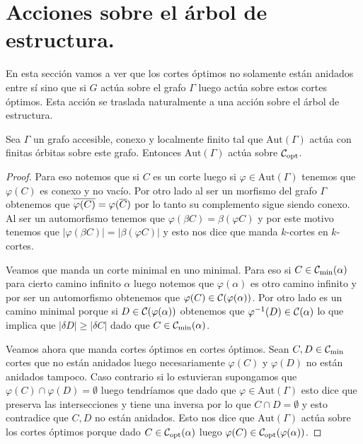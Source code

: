 \documentclass[tesis.tex]{subfiles}
\newcommand{\aut}{\text{Aut}}
\begin{document}
\section{Acciones sobre el árbol de estructura.}

En esta sección vamos a ver que los cortes óptimos no solamente están anidados entre sí sino que si $G$ actúa sobre el grafo $\Gamma$ luego actúa sobre estos cortes óptimos.
Esta acción se traslada naturalmente a una acción sobre el árbol de estructura.



\begin{prop}
	Sea $\Gamma$ un grafo accesible, conexo y localmente finito tal que $\aut(\Gamma)$ actúa con finitas órbitas sobre este grafo.
	Entonces $\aut(\Gamma)$ actúa sobre ${\cal C}_{\text{opt}}$.
\end{prop}

\begin{proof}
	Para eso notemos que si $C$ es un corte luego si $\varphi \in \aut(\Gamma)$ tenemos que $\varphi(C)$ es conexo y no vacío. 
	Por otro lado al ser un morfismo del grafo $\Gamma$ obtenemos que $\overline{\varphi(C)} = \varphi(\overline C)$ por lo tanto su complemento sigue siendo conexo.
	Al ser un automorfismo tenemos que $\varphi(\beta C) = \beta (\varphi C)$ y por este motivo tenemos que $|\varphi (\beta C)| = |\beta (\varphi C)|$ y esto nos dice que manda $k$-cortes en $k$-cortes.
	
	
	Veamos que manda un corte minimal en uno minimal. 
	Para eso si $C \in {{\cal C}}_{\text{min}}(\alpha)$ para cierto camino infinito $\alpha$ luego notemos que $\varphi(\alpha)$ es otro camino infinito y por ser un automorfismo obtenemos que $\varphi(C) \in {\cal C}({\varphi(\alpha)})$.
	Por otro lado es un camino minimal porque si $D \in {\cal C}(\varphi(\alpha))$ obtenemos que $\varphi^{-1}(D) \in {\cal C}(\alpha)$ lo que implica que $|\delta D| \ge |\delta C|$ dado que $C \in {\cal C}_{\text{min}}(\alpha)$.
	
	Veamos ahora que manda cortes óptimos en cortes óptimos.
	Sean $C,D \in {\cal C}_{\text{min}}$ cortes que no están anidados luego necesariamente $\varphi(C)$ y $\varphi(D)$ no están anidados tampoco.
	Caso contrario si lo estuvieran supongamos que $\varphi(C) \cap \varphi(D) = \emptyset$ luego tendríamos que dado que $\varphi \in \aut(\Gamma)$ esto dice que preserva las intersecciones y tiene una inversa por lo que $C \cap D = \emptyset$ y esto contradice que $C, D$ no están anidados.
	Esto nos dice que $\aut(\Gamma)$ actúa sobre los cortes óptimos porque dado $C \in {\cal C}_{\text{opt}}(\alpha)$ luego $\varphi(C) \in {\cal C}_{\text{opt}}(\varphi(\alpha))$.
	
\end{proof}
\end{document}
